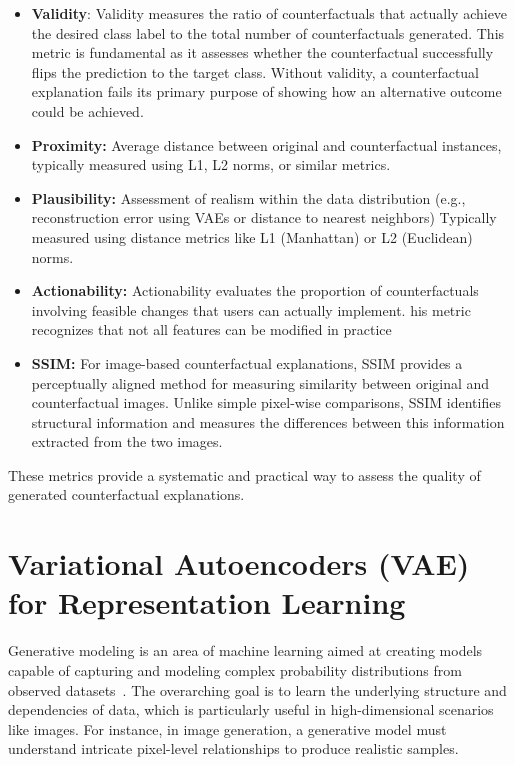 \begin{itemize}
    \item \textbf{Validity}: Validity measures the ratio of counterfactuals that actually achieve the desired class label to the total number of counterfactuals generated. This metric is fundamental as it assesses whether the counterfactual successfully flips the prediction to the target class. Without validity, a counterfactual explanation fails its primary purpose of showing how an alternative outcome could be achieved.
    \item \textbf{Proximity:} Average distance between original and counterfactual instances, typically measured using L1, L2 norms, or similar metrics.
    \item \textbf{Plausibility:} Assessment of realism within the data distribution (e.g., reconstruction error using VAEs or distance to nearest neighbors) Typically measured using distance metrics like L1 (Manhattan) or L2 (Euclidean) norms.
    \item \textbf{Actionability:} Actionability evaluates the proportion of counterfactuals involving feasible changes that users can actually implement. his metric recognizes that not all features can be modified in practice
    \item \textbf{SSIM:} For image-based counterfactual explanations, SSIM provides a perceptually aligned method for measuring similarity between original and counterfactual images. Unlike simple pixel-wise comparisons, SSIM identifies structural information and measures the differences between this information extracted from the two images. 
\end{itemize}

These metrics provide a systematic and practical way to assess the quality of generated counterfactual explanations.





















\section{Variational Autoencoders (VAE) for Representation Learning}
Generative modeling is an area of machine learning aimed at creating models capable of capturing and modeling complex probability distributions from observed datasets~\cite{doersch2016tutorial}. The overarching goal is to learn the underlying structure and dependencies of data, which is particularly useful in high-dimensional scenarios like images. For instance, in image generation, a generative model must understand intricate pixel-level relationships to produce realistic samples.

